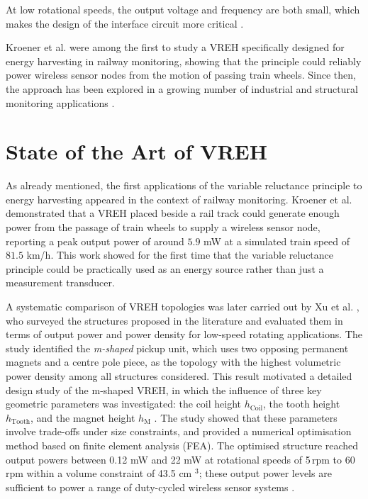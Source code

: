 At low rotational speeds, the output voltage and frequency
are both small, which makes the design of the interface
circuit more critical \cite{xuSystemImplementationTradeOffs2021}.

Kroener et
al. \cite{kroenerVariableReluctanceHarvester2013} were among the first to study a
VREH specifically designed for energy harvesting in railway
monitoring, showing that the principle could reliably power
wireless sensor nodes from the motion of passing train
wheels. Since then, the approach has been explored in a
growing number of industrial and structural monitoring
applications \cite{xuSurveyVariableReluctance2018, xuDesignModelingOptimization2019a}.





\section{State of the Art of VREH}


As already mentioned, the first applications of the
variable reluctance principle
to energy harvesting appeared in the context of railway
monitoring. Kroener et al. \cite{kroenerVariableReluctanceHarvester2013} demonstrated
that a VREH placed beside a rail track could generate
enough power from the passage of train wheels to supply a
wireless sensor node, reporting a peak output power of
around $5.9$ mW at a simulated train speed of $81.5$ km/h.
This work showed for the first time that the variable
reluctance principle could be practically used as an energy source
rather than just a measurement transducer.

A systematic comparison of VREH topologies was later
carried out by Xu et al. \cite{xuSurveyVariableReluctance2018}, who surveyed
the structures proposed in the literature and evaluated
them in terms of output power and power density for
low-speed rotating applications. The study identified the
\emph{m-shaped} pickup unit, which uses two opposing
permanent magnets and a centre pole piece, as the
topology with the highest volumetric power density among
all structures considered. This result motivated a
detailed design study of the m-shaped VREH, in which
the influence of three key geometric parameters was
investigated: the coil height $h_\text{Coil}$, the tooth
height $h_\text{Tooth}$, and the magnet height
$h_\text{M}$ \cite{xuDesignModelingOptimization2019a}. The study
showed that these parameters involve trade-offs under size
constraints, and provided a numerical optimisation method
based on finite element analysis (FEA). The optimised
structure reached output powers between 0.12 mW and
22 mW at rotational speeds of 5\,rpm to 60 rpm within
a volume constraint of 43.5 cm $^3$; these output power levels
are sufficient to power a range of duty-cycled wireless sensor
systems \cite{xuDesignModelingOptimization2019a}.

